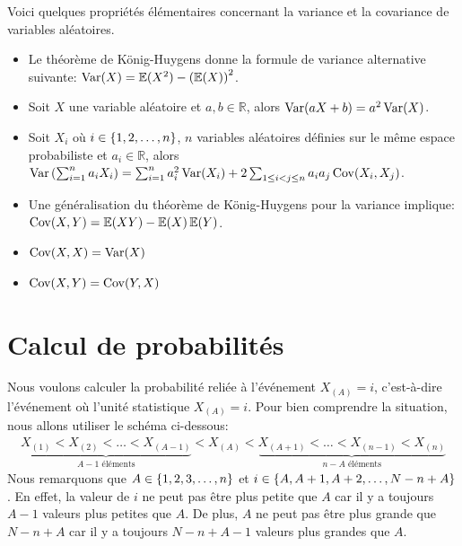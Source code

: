 \documentclass[10pt]{article}
\begin{document}
Voici quelques propriétés élémentaires concernant la variance et la
covariance de variables aléatoires.

\begin{itemize}
\item
  Le théorème de König-Huygens donne la formule de variance alternative
  suivante: \(\operatorname{Var}(X)=\operatorname{\mathbb{E}}(X^2)-\left(\operatorname{\mathbb{E}}(X)\right)^2\).
\item
  Soit \(X\) une variable aléatoire et \(a,b\in\mathbb{R}\), alors
  \(\operatorname{Var}(aX+b)=a^2\operatorname{Var}(X)\).
\item
  Soit \(X_i\) où \(i\in\left\{1,2,\ldots,n\right\}\), \(n\) variables aléatoires
  définies sur le même espace probabiliste et \(a_i\in\mathbb{R}\),
  alors
  \(\operatorname{Var}\left(\sum_{i=1}^n a_iX_i\right)=\sum_{i=1}^n a_i^2\operatorname{Var}(X_i)+2\sum_{1\leq i< j\leq n} a_ia_j\operatorname{Cov}(X_i,X_j)\).
\item
  Une généralisation du théorème de König-Huygens pour la variance
  implique: \(\operatorname{Cov}(X,Y)=\operatorname{\mathbb{E}}(XY)-\operatorname{\mathbb{E}}(X)\operatorname{\mathbb{E}}(Y)\).
\item
  \(\operatorname{Cov}(X,X)=\operatorname{Var}(X)\)
\item
  \(\operatorname{Cov}(X,Y)=\operatorname{Cov}(Y,X)\)
\end{itemize}

\hypertarget{calcul-de-probabilites}{%
\section{\texorpdfstring{Calcul de probabilités
\label{calculs_proba}}{Calcul de probabilités }}\label{calcul-de-probabilites}}

Nous voulons calculer la probabilité reliée à l'événement \(X_{(A)}=i\),
c'est-à-dire l'événement où l'unité statistique \(X_{(A)}=i\). Pour bien
comprendre la situation, nous allons utiliser le schéma ci-dessous:
\begin{align*}
\underbrace{X_{(1)} <  X_{(2)} < \ldots < X_{(A-1)}}_{A-1 \text{ éléments}} 
< X_{(A)} 
< \underbrace{X_{(A+1)} < \ldots < X_{(n-1)} < X_{(n)}}_{n-A \text{ éléments}}
\end{align*} Nous remarquons que \(A\in\left\{1,2,3,\ldots, n\right\}\) et
\(i\in\left\{A,A+1,A+2,\ldots,N-n+A\right\}\). En effet, la valeur de \(i\) ne
peut pas être plus petite que \(A\) car il y a toujours \(A-1\) valeurs
plus petites que \(A\). De plus, \(A\) ne peut pas être plus grande que
\(N-n+A\) car il y a toujours \(N-n+A-1\) valeurs plus grandes que
\(A\).
\end{document}
